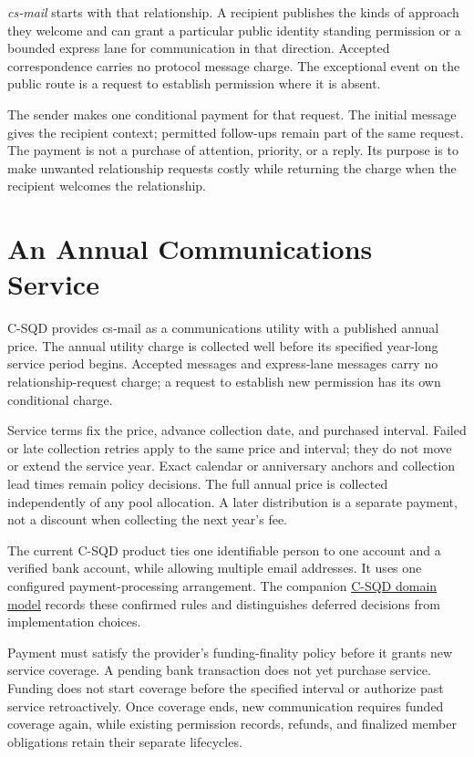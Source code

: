 \documentclass[11pt]{article}
\begin{document}
\textit{cs-mail} starts with that relationship. A recipient publishes the kinds
of approach they welcome and can grant a particular public identity standing
permission or a bounded express lane for communication in that direction.
Accepted correspondence carries no protocol message charge. The exceptional
event on the public route is a request to establish permission where it is absent.

The sender makes one conditional payment for that request. The initial message
gives the recipient context; permitted follow-ups remain part of the same request.
The payment is not a purchase of attention, priority, or a reply. Its purpose is
to make unwanted relationship requests costly while returning the charge when
the recipient welcomes the relationship.

\section{An Annual Communications Service}

C-SQD provides cs-mail as a communications utility with a published annual price.
The annual utility charge is collected well before its specified year-long
service period begins. Accepted messages
and express-lane messages carry no relationship-request charge; a request to
establish new permission has its own conditional charge.

Service terms fix the price, advance collection date, and purchased interval.
Failed or late collection retries apply to the same price and interval; they
do not move or extend the service year. Exact calendar or anniversary anchors
and collection lead times remain policy decisions. The full annual price is
collected independently of any pool allocation. A later distribution is a
separate payment, not a discount when collecting the next year's fee.

The current C-SQD product ties one identifiable person to one account and a
verified bank account, while allowing multiple email addresses. It uses one
configured payment-processing arrangement. The companion
\href{DOMAIN_MODEL.md}{C-SQD domain model} records these confirmed rules and
distinguishes deferred decisions from implementation choices.

Payment must satisfy the provider's funding-finality policy before it grants new
service coverage. A pending bank transaction does not yet purchase service.
Funding does not start coverage before the specified interval or authorize past
service retroactively. Once coverage ends, new communication requires funded coverage again, while
existing permission records, refunds, and finalized member obligations retain
their separate lifecycles.
\end{document}
